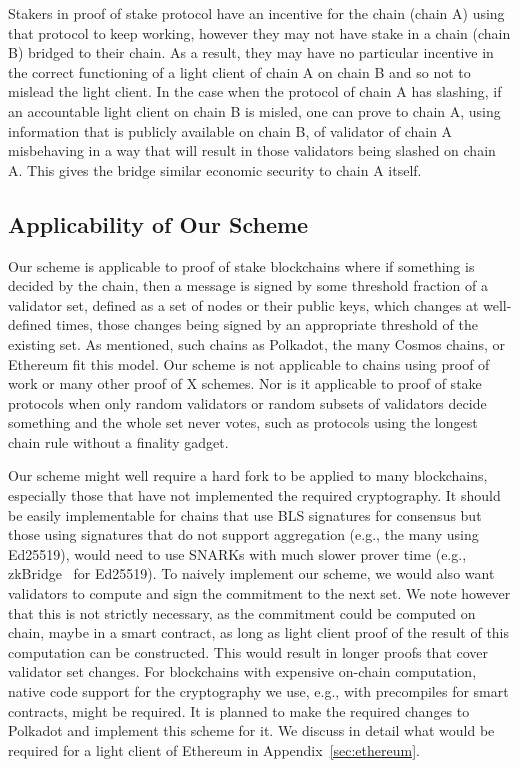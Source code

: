 \noindent Stakers in proof of stake protocol have an incentive for the chain (chain A) using that protocol to keep working, however they may not have stake in a chain (chain B) bridged to their chain. As a result, they may have no particular incentive in the correct functioning of a light client of chain A on chain B and so not to mislead the light client. In the case when the protocol of chain A has slashing, if an accountable light client on chain B is misled, one can prove to chain A, using information that is publicly available on chain B, of validator of chain A misbehaving in a way that will result in those validators being slashed on chain A. This gives the bridge similar economic security to chain A itself.

\vspace{-0.08in}
\subsection{Applicability of Our Scheme}

\noindent Our scheme is applicable to proof of stake blockchains where if something is decided by the chain, then a message is signed by some threshold fraction of a validator set, defined as a set of nodes or their public keys, which changes at well-defined times, those changes being signed by an appropriate threshold of the existing set. As mentioned, such chains as Polkadot, the many Cosmos chains, or Ethereum fit this model. Our scheme is not applicable to chains using proof of work or many other proof of X schemes. Nor is it applicable to proof of stake protocols when only random validators or random subsets of validators decide something and the whole set never votes, such as protocols using the longest chain rule without a finality gadget.

\noindent Our scheme might well require a hard fork to be applied to many blockchains, especially those that have not implemented the required cryptography. It should be easily implementable for chains that use BLS signatures for consensus but those using signatures that do not support aggregation (e.g., the many using Ed25519), would need to use SNARKs with much slower prover time (e.g., zkBridge~\cite{zkBridge} for Ed25519). To naively implement our scheme, we would also want validators to compute and sign the commitment to the next set. We note however that this is not strictly necessary, as the commitment could be computed on chain, maybe in a smart contract, as long as light client proof of the result of this computation can be constructed. This would result in longer proofs that cover validator set changes. For blockchains with expensive on-chain computation, native code support for the cryptography we use, e.g., with precompiles for smart contracts, might be required. It is planned to make the required changes to Polkadot and implement this scheme for it. We discuss in detail what would be required for a light client of Ethereum in Appendix~\ref{sec:ethereum}.
\vspace{-0.1in}
